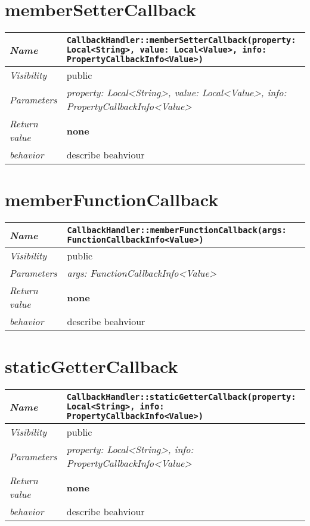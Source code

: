  \section{memberSetterCallback}
\begin{longtable}{p{3cm} @{\hskip 1cm} p{12cm}}
 \hline
\textit{Name} & \texttt{CallbackHandler::memberSetterCallback(property: Local<String>, value: Local<Value>, info: PropertyCallbackInfo<Value>)}\\
\hline
 \textit{Visibility} & public\\
\hline
\textit{Parameters} & \textit{property: Local<String>, value: Local<Value>, info: PropertyCallbackInfo<Value>}\\
\hline
\textit{Return value} & \textbf{none}\\
  \hline
 \textit{behavior} & describe beahviour \\
\hline
\end{longtable} \pagebreak
 \section{memberFunctionCallback}
\begin{longtable}{p{3cm} @{\hskip 1cm} p{12cm}}
 \hline
\textit{Name} & \texttt{CallbackHandler::memberFunctionCallback(args: FunctionCallbackInfo<Value>)}\\
\hline
 \textit{Visibility} & public\\
\hline
\textit{Parameters} & \textit{args: FunctionCallbackInfo<Value>}\\
\hline
\textit{Return value} & \textbf{none}\\
  \hline
 \textit{behavior} & describe beahviour \\
\hline
\end{longtable} \pagebreak
 \section{staticGetterCallback}
\begin{longtable}{p{3cm} @{\hskip 1cm} p{12cm}}
 \hline
\textit{Name} & \texttt{CallbackHandler::staticGetterCallback(property: Local<String>, info: PropertyCallbackInfo<Value>)}\\
\hline
 \textit{Visibility} & public\\
\hline
\textit{Parameters} & \textit{property: Local<String>, info: PropertyCallbackInfo<Value>}\\
\hline
\textit{Return value} & \textbf{none}\\
  \hline
 \textit{behavior} & describe beahviour \\
\hline
\end{longtable} \pagebreak
